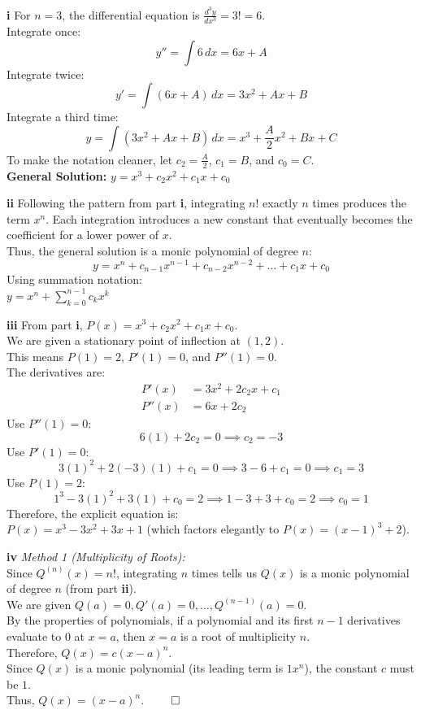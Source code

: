 \begin{solution}
\textbf{i} For $n=3$, the differential equation is $\frac{d^3 y}{dx^3} = 3! = 6$. \\
Integrate once:
\[ y'' = \int 6 \, dx = 6x + A \]
Integrate twice:
\[ y' = \int (6x + A) \, dx = 3x^2 + Ax + B \]
Integrate a third time:
\[ y = \int (3x^2 + Ax + B) \, dx = x^3 + \frac{A}{2}x^2 + Bx + C \]
To make the notation cleaner, let $c_2 = \frac{A}{2}$, $c_1 = B$, and $c_0 = C$. \\
\textbf{General Solution:} $y = x^3 + c_2x^2 + c_1x + c_0$

\vspace{0.3cm}
\textbf{ii} Following the pattern from part \textbf{i}, integrating $n!$ exactly $n$ times produces the term $x^n$. Each integration introduces a new constant that eventually becomes the coefficient for a lower power of $x$. \\
Thus, the general solution is a monic polynomial of degree $n$:
\[ y = x^n + c_{n-1}x^{n-1} + c_{n-2}x^{n-2} + \dots + c_1x + c_0 \]
Using summation notation: \\
\textbf{$y = x^n + \sum_{k=0}^{n-1} c_k x^k$}

\vspace{0.3cm}
\textbf{iii} From part \textbf{i}, $P(x) = x^3 + c_2x^2 + c_1x + c_0$. \\
We are given a stationary point of inflection at $(1, 2)$. \\
This means $P(1) = 2$, $P'(1) = 0$, and $P''(1) = 0$. \\
The derivatives are:
\begin{align*}
    P'(x) &= 3x^2 + 2c_2x + c_1 \\
    P''(x) &= 6x + 2c_2
\end{align*}
Use $P''(1) = 0$:
\[ 6(1) + 2c_2 = 0 \implies c_2 = -3 \]
Use $P'(1) = 0$:
\[ 3(1)^2 + 2(-3)(1) + c_1 = 0 \implies 3 - 6 + c_1 = 0 \implies c_1 = 3 \]
Use $P(1) = 2$:
\[ 1^3 - 3(1)^2 + 3(1) + c_0 = 2 \implies 1 - 3 + 3 + c_0 = 2 \implies c_0 = 1 \]
Therefore, the explicit equation is: \\
\textbf{$P(x) = x^3 - 3x^2 + 3x + 1$} (which factors elegantly to $P(x) = (x-1)^3 + 2$).

\vspace{0.3cm}
\textbf{iv} \textit{Method 1 (Multiplicity of Roots):} \\
Since $Q^{(n)}(x) = n!$, integrating $n$ times tells us $Q(x)$ is a monic polynomial of degree $n$ (from part \textbf{ii}). \\
We are given $Q(a) = 0, Q'(a) = 0, \dots, Q^{(n-1)}(a) = 0$. \\
By the properties of polynomials, if a polynomial and its first $n-1$ derivatives evaluate to $0$ at $x=a$, then $x=a$ is a root of multiplicity $n$. \\
Therefore, $Q(x) = c(x-a)^n$. \\
Since $Q(x)$ is a monic polynomial (its leading term is $1x^n$), the constant $c$ must be $1$. \\
Thus, $Q(x) = (x-a)^n$. $\qed$


\end{solution}
